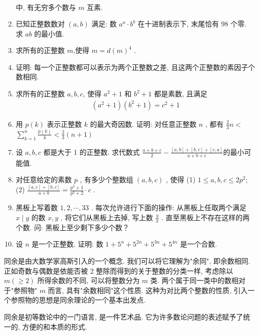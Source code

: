 \begin{enumerate}
\begin{align*}
    \end{align*}
    中, 有无穷多个数与 $m$ 互素.
    \item 已知正整数数对 $(a, b)$ 满足: 数 $a^{a} \cdot b^{b}$ 在十进制表示下, 末尾恰有 98 个零. 求 $a b$ 的最小值. 
    \item 求所有的正整数 $m$,使得 $m=d(m)^{4}$ . 
    \item 证明: 每一个正整数都可以表示为两个正整数之差, 且这两个正整数的素因子个数相同. 
    \item 求所有的正整数 $a ,  b ,  c$, 使得 $a^{2}+1$ 和 $b^{2}+1$ 都是素数, 且满足
    \begin{align*}
        \left(a^{2}+1\right)\left(b^{2}+1\right)=c^{2}+1
    \end{align*}
    \item 用 $p(k)$ 表示正整数 $k$ 的最大奇因数. 证明: 对任意正整数 $n$ , 都有 $\frac{2}{3} n<$ $\sum_{k=1}^{n} \frac{p(k)}{k}<\frac{2}{3}(n+1)$
    \item 设 $a ,  b ,  c$ 都是大于 1 的正整数. 求代数式 $\frac{a+b+c}{2}-\frac{[a, b]+[b, c]+[c, a]}{a+b+c}$的最小可能值. 
    \item 对任意给定的素数 $p$ , 有多少个整数组 $(a, b, c)$ , 使得
    (1) $1 \leqslant a, b, c \leqslant 2 p^{2}$;
    (2) $\frac{[a, c]+[b, c]}{a+b}=\frac{p^{2}+1}{p^{2}+2} \cdot c$ .
    \item 黑板上写着数 $1,2, \cdots, 33$ . 每次允许进行下面的操作: 从黑板上任取两个满足 $x \mid y$ 的数 $x ,  y$ , 将它们从黑板上去掉, 写上数 $\frac{y}{x}$ . 直至黑板上不存在这样的两个数. 问: 黑板上至少剩下多少个数？
    \item 设 $n$ 是一个正整数. 证明: 数 $1+5^{n}+5^{2 n}+5^{3 n}+5^{4 n}$ 是一个合数.
\end{enumerate}

同余是由大数学家高斯引入的一个概念. 我们可以将它理解为"余同", 即余数相同. 正如奇数与偶数是依能否被 2 整除而得到的关于整数的分类一样, 考虑除以 $m(\geqslant 2)$ 所得余数的不同, 可以将整数分为 $m$ 类. 两个属于同一类中的数相对于"参照物" $m$ 而言, 具有"余数相同"这个性质. 这种为对比两个整数的性质, 引入一个参照物的思想是同余理论的一个基本出发点.

同余是初等数论中的一门语言, 是一件艺术品. 它为许多数论问题的表述赋予了统一的, 方便的和本质的形式.

